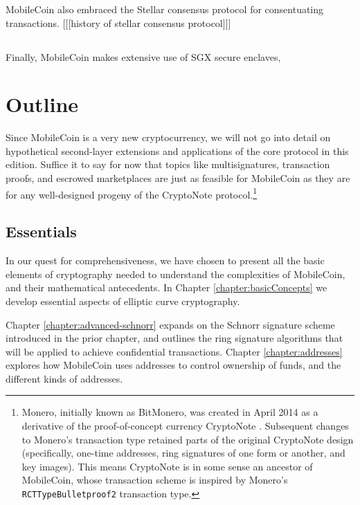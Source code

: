 MobileCoin also embraced the Stellar consensus protocol for consentuating transactions. [[[history of stellar consensus protocol]]]


\subsection{}

Finally, MobileCoin makes extensive use of SGX secure enclaves, 
\fi


\section{Outline}

Since MobileCoin is a very new cryptocurrency, we will not go into detail on hypothetical second-layer extensions and applications of the core protocol in this edition. Suffice it to say for now that topics like multisignatures, transaction proofs, and escrowed marketplaces are just as feasible for MobileCoin as they are for any well-designed progeny of the CryptoNote protocol.\footnote{Monero, initially known as BitMonero, was created in April 2014 as a derivative of the proof-of-concept currency CryptoNote \cite{bitmonero-launched}. Subsequent changes to Monero's transaction type retained parts of the original CryptoNote design (specifically, one-time addresses, ring signatures of one form or another, and key images). This means CryptoNote is in some sense an ancestor of MobileCoin, whose transaction scheme is inspired by Monero's {\tt RCTTypeBulletproof2} transaction type.}


\subsection{Essentials}%

In our quest for comprehensiveness, we have chosen to present all the basic elements of cryptography needed to understand the complexities of MobileCoin, and their mathematical antecedents. In Chapter \ref{chapter:basicConcepts} we develop essential aspects of elliptic curve cryptography.

Chapter \ref{chapter:advanced-schnorr} expands on the Schnorr signature scheme introduced in the prior chapter, and outlines the ring signature algorithms that will be applied to achieve confidential transactions. Chapter \ref{chapter:addresses} explores how MobileCoin uses addresses to control ownership of funds, and the different kinds of addresses.

